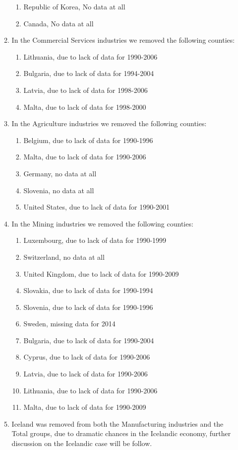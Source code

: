 \documentclass[14pt,oneside]{amsart}
\begin{document}
\begin{appendices}
\begin{enumerate}
\begin{enumerate}
\begin{enumerate}
 	  	\item Republic of Korea, No data at all 	  	
 	  	\item Canada, No data at all
 		\end{enumerate}
	\item In the Commercial Services industries we removed the following counties:
		\begin{enumerate}   	 
  	  	\item Lithuania, due to lack of data for 1990-2006
  	  	\item Bulgaria, due to lack of data for 1994-2004
  	  	\item Latvia, due to lack of data for 1998-2006
  	  	\item Malta, due to lack of data for 1998-2000
  		\end{enumerate}
  		\item In the Agriculture industries we removed the following counties:
		\begin{enumerate}   	 
  	  	\item Belgium, due to lack of data for 1990-1996
  	  	\item Malta, due to lack of data for 1990-2006
  	  	\item Germany, no data at all
  	  	\item Slovenia, no data at all
  	  	\item United States, due to lack of data for 1990-2001
  		\end{enumerate}
  		\item In the Mining industries we removed the following counties:
		\begin{enumerate}   	 
  	  	\item Luxembourg, due to lack of data for 1990-1999
  	  	\item Switzerland, no data at all
  	  	\item United Kingdom, due to lack of data for 1990-2009
  	  	\item Slovakia, due to lack of data for 1990-1994
  	  	\item Slovenia, due to lack of data for 1990-1996
  	  	\item Sweden, missing data for 2014
  	  	\item Bulgaria, due to lack of data for 1990-2004
 	  	\item Cyprus, due to lack of data for 1990-2006
 	  	\item Latvia, due to lack of data for 1990-2006
 	  	\item Lithuania, due to lack of data for 1990-2006
 	  	\item Malta, due to lack of data for 1990-2009
  		\end{enumerate}
  	\item Iceland was removed from both the Manufacturing industries and the Total groups, due to dramatic chances in the Icelandic economy, further discussion on the Icelandic case will be follow.
  	\end{enumerate}
\end{enumerate}


\end{appendices}
\end{document}
